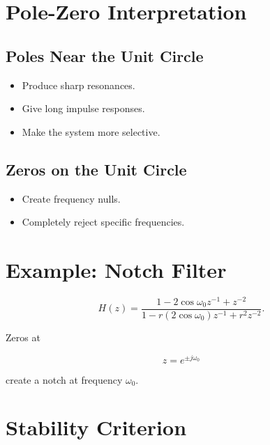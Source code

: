 \section{Pole-Zero Interpretation}


\subsection{Poles Near the Unit Circle}

\begin{itemize}
\item Produce sharp resonances.
\item Give long impulse responses.
\item Make the system more selective.
\end{itemize}


\subsection{Zeros on the Unit Circle}

\begin{itemize}
\item Create frequency nulls.
\item Completely reject specific frequencies.
\end{itemize}


\section{Example: Notch Filter}

\[
H(z)=
\frac{1-2\cos\omega_0 z^{-1}+z^{-2}}
{1-r(2\cos\omega_0)z^{-1}+r^2 z^{-2}}.
\]

Zeros at

\[
z=e^{\pm j\omega_0}
\]

create a notch at frequency \(\omega_0\).


\section{Stability Criterion}

